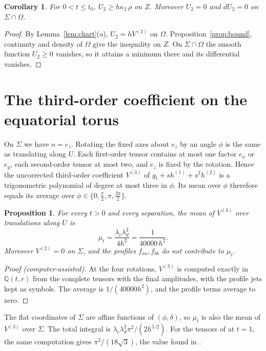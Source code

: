 \documentclass[11pt]{amsart}
\newtheorem{proposition}[theorem]{Proposition}
\newtheorem{corollary}[theorem]{Corollary}
\theoremstyle{definition}
\theoremstyle{remark}
\newcommand{\Q}{\mathbb{Q}}
\begin{document}
\begin{corollary}\label{cor:U2}
For $0<t\le t_0$, $U_2\ge h\kappa_2\,\rho$ on $Z$. Moreover $U_2=0$ and $dU_2=0$ on $\Sigma\cap\Omega$.
\end{corollary}

\begin{proof}
By Lemma~\ref{lem:chart}(a), $U_2=hV^{(2)}$ on $\Omega$. Proposition~\ref{prop:bound}, continuity and density of $\Omega$ give the inequality on $Z$. On $\Sigma\cap\Omega$ the smooth function $U_2\ge0$ vanishes, so it attains a minimum there and its differential vanishes.
\end{proof}

\section{The third-order coefficient on the equatorial torus}\label{sec:cubic}

On $\Sigma$ we have $n=e_z$. Rotating the fixed axes about $e_z$ by an angle $\phi$ is the same as translating along $U$. Each first-order tensor contains at most one factor $e_x$ or $e_y$, each second-order tensor at most two, and $e_z$ is fixed by the rotation. Hence the uncorrected third-order coefficient $V^{(3)}$ of $g_t+sh^{(1)}+s^2h^{(2)}$ is a trigonometric polynomial of degree at most three in $\phi$. Its mean over $\phi$ therefore equals its average over $\phi\in\{0,\frac\pi2,\pi,\frac{3\pi}2\}$.

\begin{proposition}\label{prop:cubic}
For every $t>0$ and every separation, the mean of $V^{(3)}$ over translations along $U$ is
\[ \mu_t=\frac{\lambda_c\lambda_d^2}{4h^2}=\frac1{40000\,h^2}. \]
Moreover $V^{(2)}=0$ on $\Sigma$, and the profiles $f_{aa},f_{bb}$ do not contribute to $\mu_t$.
\end{proposition}

\begin{proof}[Proof (computer-assisted)]
At the four rotations, $V^{(3)}$ is computed exactly in $\Q(t,r)$ from the complete tensors with the final amplitudes, with the profile jets kept as symbols. The average is $1/(40000h^2)$, and the profile terms average to zero.
\end{proof}

The flat coordinates of $\Sigma$ are affine functions of $(\phi,\delta)$, so $\mu_t$ is also the mean of $V^{(3)}$ over $\Sigma$. The total integral is $\lambda_c\lambda_d^2\pi^2/(2h^{5/2})$. For the tensors of \cite{BH} at $t=1$, the same computation gives $\pi^2/(18\sqrt3)$, the value found in \cite[Proposition~5.5]{BH}.
\end{document}
